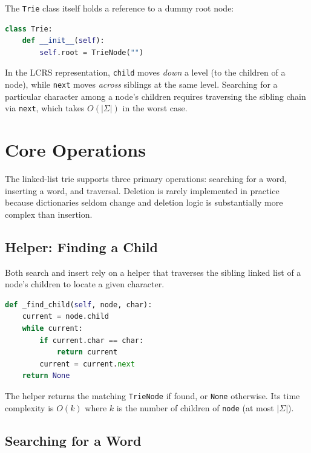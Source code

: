 \documentclass[11pt, a4paper, notitlepage]{report}
\theoremstyle{definition}
\theoremstyle{remark}
\theoremstyle{definition}
\begin{document}
The \texttt{Trie} class itself holds a reference to a dummy root node:

\begin{lstlisting}[language=Python]
class Trie:
    def __init__(self):
        self.root = TrieNode("")
\end{lstlisting}

\begin{examtip}[title={Exam Tip: Navigating the Linked-List Trie}]
In the LCRS representation, \texttt{child} moves \emph{down} a level
(to the children of a node), while \texttt{next} moves \emph{across}
siblings at the same level.  Searching for a particular character among a
node's children requires traversing the sibling chain via \texttt{next},
which takes $O(|\Sigma|)$ in the worst case.
\end{examtip}

\section{Core Operations}
\label{sec:trie-ops}

The linked-list trie supports three primary operations: searching for a word,
inserting a word, and traversal.  Deletion is rarely implemented in practice
because dictionaries seldom change and deletion logic is substantially more
complex than insertion.

\subsection{Helper: Finding a Child}
\label{subsec:trie-find-child}

Both search and insert rely on a helper that traverses the sibling linked list
of a node's children to locate a given character.

\begin{lstlisting}[language=Python]
def _find_child(self, node, char):
    current = node.child
    while current:
        if current.char == char:
            return current
        current = current.next
    return None
\end{lstlisting}

The helper returns the matching \texttt{TrieNode} if found, or \texttt{None}
otherwise.  Its time complexity is $O(k)$ where $k$ is the number of children
of \texttt{node} (at most $|\Sigma|$).

\subsection{Searching for a Word}
\label{subsec:trie-search}
\end{document}

